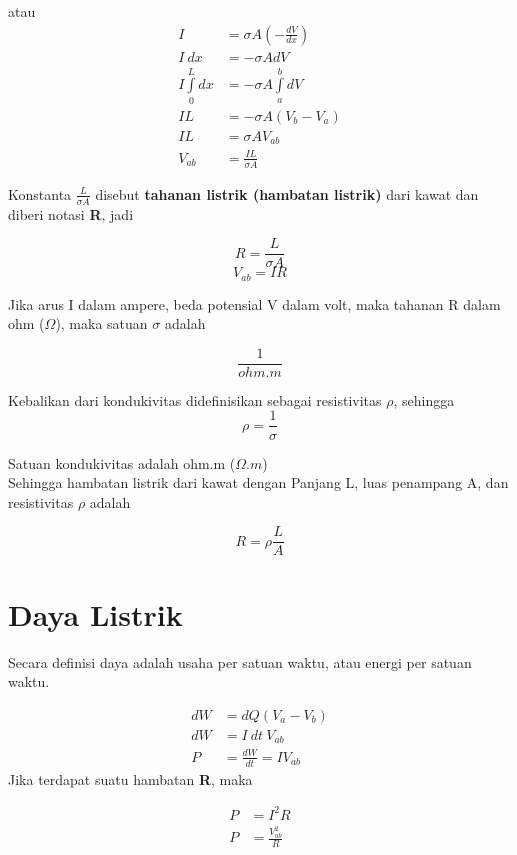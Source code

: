 \documentclass[twocolumn, 11pt]{article}%
\begin{document}
    atau
    \begin{align*}
        I&= \sigma A \left(-\frac{dV}{dx}\right)\\
        I\ dx&= -\sigma A dV\\
        I\int\limits_0^L dx &= -\sigma A \int\limits_a^b dV\\
        IL&=-\sigma A(V_b -V_a)\\
        IL&= \sigma AV_{ab}\\
        V_{ab} &= \frac{IL}{\sigma A}
    \end{align*}

    Konstanta $\displaystyle \frac{L}{\sigma A}$ disebut \textbf{tahanan listrik (hambatan listrik)} dari kawat dan diberi notasi \textbf{R}, jadi

    \[R=\frac{L}{\sigma A}\]
    \[V_{ab}=IR \]

    Jika arus I dalam ampere, beda potensial V dalam volt, maka tahanan R dalam ohm ($\Omega$), maka satuan $\sigma$ adalah

    \[\frac1{ohm.m} \]

    Kebalikan dari kondukivitas didefinisikan sebagai resistivitas $\rho$, sehingga
    \[\rho=\frac1{\sigma} \]

    Satuan kondukivitas adalah ohm.m ($\Omega.m$)\\

    Sehingga hambatan listrik dari kawat dengan Panjang L, luas penampang A, dan resistivitas $\rho$ adalah

    \[ R=\rho\frac{L}A \]

    \section{Daya Listrik}%
    Secara definisi daya adalah usaha per satuan waktu, atau energi per satuan waktu.

    \begin{align*}
        dW&=dQ(V_a-V_b)\\
        dW&= I\ dt\ V_{ab}\\
        P&=\frac{dW}{dt}=IV_{ab}
    \end{align*}
    Jika terdapat suatu hambatan \textbf{R}, maka

    \begin{align*}
        P&=I^2R\\
        P&= \frac{V^2_{ab}}{R}
    \end{align*}
\end{document}

